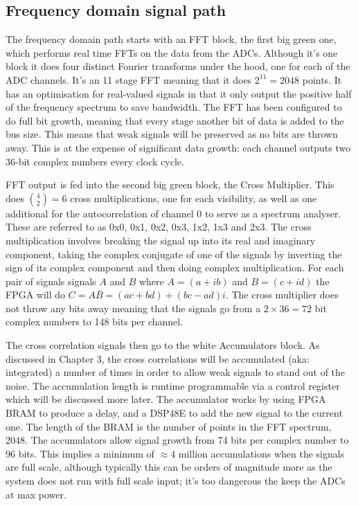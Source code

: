 \subsection{Frequency domain signal path}
The frequency domain path starts with an FFT block, the first big green one,  which performs real time FFTs on the data from the ADCs. Although it's one block it does four distinct Fourier transforms under the hood, one for each of the ADC channels. It's an 11 stage FFT meaning that it does \(2^{11} = 2048\) points. It has an optimisation for real-valued signals in that it only output the positive half of the frequency spectrum to save bandwidth. The FFT has been configured to do full bit growth, meaning that every stage another bit of data is added to the bus size. This means that weak signals will be preserved as no bits are thrown away. This is at the expense of significant data growth: each channel outputs two 36-bit complex numbers every clock cycle.

FFT output is fed into the second big green block, the Cross Multiplier. This does \({4 \choose 2} = 6\) cross multiplications, one for each visibility, as well as one additional for the autocorrelation of channel 0 to serve as a spectrum analyser. These are referred to as 0x0, 0x1, 0x2, 0x3, 1x2, 1x3 and 2x3. The cross multiplication involves breaking the signal up into its real and imaginary component, taking the complex conjugate of one of the signals by inverting the sign of its complex component and then doing complex multiplication. For each pair of signals signals \(A\) and \(B\) where \(A = (a + ib)\) and \(B = (c + id)\) the FPGA will do \(C = A\overline{B} = (ac + bd) + (bc - ad)i\). The cross multiplier does not throw any bits away meaning that the signals go from a \(2 \times 36 = 72\) bit complex numbers to 148 bits per channel.

The cross correlation signals then go to the white Accumulators block. As discussed in Chapter 3, the cross correlations will be accumulated (aka: integrated) a number of times in order to allow weak signals to stand out of the noise. The accumulation length is runtime programmable via a control register which will be discussed more later. The accumulator works by using FPGA BRAM to produce a delay, and a DSP48E to add the new signal to the current one. The length of the BRAM is the number of points in the FFT spectrum, 2048. The accumulators allow signal growth from 74 bits per complex number to 96 bits. This implies a minimum of \(\approx 4\) million accumulations when the signals are full scale, although typically this can be orders of magnitude more as the system does not run with full scale input; it's too dangerous the keep the ADCs at max power.

